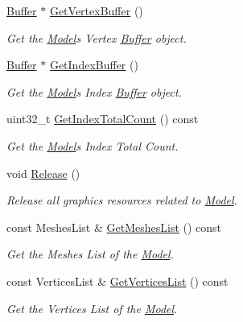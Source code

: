 \begin{DoxyCompactItemize}
\item 
\hyperlink{classBuffer}{Buffer} $\ast$ \hyperlink{classModel_a48c5723ee018e1fb2875d510b32372e4}{Get\+Vertex\+Buffer} ()
\begin{DoxyCompactList}\small\item\em Get the \hyperlink{classModel}{Model}\textquotesingle{}s Vertex \hyperlink{classBuffer}{Buffer} object. \end{DoxyCompactList}\item 
\hyperlink{classBuffer}{Buffer} $\ast$ \hyperlink{classModel_a22b66b76c6f8e17f9239d500ff03d09f}{Get\+Index\+Buffer} ()
\begin{DoxyCompactList}\small\item\em Get the \hyperlink{classModel}{Model}\textquotesingle{}s Index \hyperlink{classBuffer}{Buffer} object. \end{DoxyCompactList}\item 
uint32\+\_\+t \hyperlink{classModel_a6a2d8f9eddca5db21295de9c90b87421}{Get\+Index\+Total\+Count} () const
\begin{DoxyCompactList}\small\item\em Get the \hyperlink{classModel}{Model}\textquotesingle{}s Index Total Count. \end{DoxyCompactList}\item 
\mbox{\label{classModel_a2fc308f7267e7034ff3cf07f3e62c09d}} 
void \hyperlink{classModel_a2fc308f7267e7034ff3cf07f3e62c09d}{Release} ()
\begin{DoxyCompactList}\small\item\em Release all graphics resources related to \hyperlink{classModel}{Model}. \end{DoxyCompactList}\item 
const Meshes\+List \& \hyperlink{classModel_a759f50783d758801f2893d8991acb349}{Get\+Meshes\+List} () const
\begin{DoxyCompactList}\small\item\em Get the Meshes List of the \hyperlink{classModel}{Model}. \end{DoxyCompactList}\item 
const Vertices\+List \& \hyperlink{classModel_a188605e846853ac0020678922e898015}{Get\+Vertices\+List} () const
\begin{DoxyCompactList}\small\item\em Get the Vertices List of the \hyperlink{classModel}{Model}. \end{DoxyCompactList}\item 

\end{DoxyCompactItemize}
